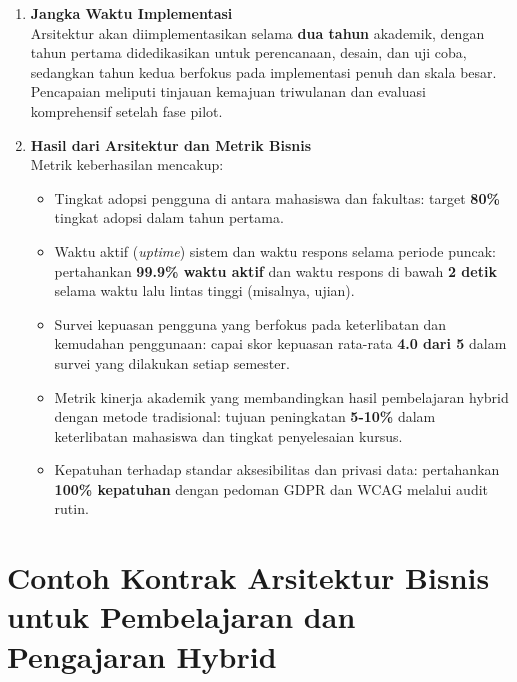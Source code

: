 \begin{enumerate}
	\item \textbf{Jangka Waktu Implementasi} \\
	Arsitektur akan diimplementasikan selama \textbf{dua tahun} akademik, dengan tahun pertama didedikasikan untuk perencanaan, desain, dan uji coba, sedangkan tahun kedua berfokus pada implementasi penuh dan skala besar. Pencapaian meliputi tinjauan kemajuan triwulanan dan evaluasi komprehensif setelah fase pilot.
	
	\item \textbf{Hasil dari Arsitektur dan Metrik Bisnis} \\
	Metrik keberhasilan mencakup:
	\begin{itemize}
		\item Tingkat adopsi pengguna di antara mahasiswa dan fakultas: target \textbf{80\%} tingkat adopsi dalam tahun pertama.
		\item Waktu aktif (\textit{uptime}) sistem dan waktu respons selama periode puncak: pertahankan \textbf{99.9\% waktu aktif} dan waktu respons di bawah \textbf{2 detik} selama waktu lalu lintas tinggi (misalnya, ujian).
		\item Survei kepuasan pengguna yang berfokus pada keterlibatan dan kemudahan penggunaan: capai skor kepuasan rata-rata \textbf{4.0 dari 5} dalam survei yang dilakukan setiap semester.
		\item Metrik kinerja akademik yang membandingkan hasil pembelajaran hybrid dengan metode tradisional: tujuan peningkatan \textbf{5-10\%} dalam keterlibatan mahasiswa dan tingkat penyelesaian kursus.
		\item Kepatuhan terhadap standar aksesibilitas dan privasi data: pertahankan \textbf{100\% kepatuhan} dengan pedoman GDPR dan WCAG melalui audit rutin.
	\end{itemize}
	
\end{enumerate}


\section{Contoh Kontrak Arsitektur Bisnis untuk Pembelajaran dan Pengajaran Hybrid}
\label{sec:contoh_kontrak_arsitektur_bisnis}


